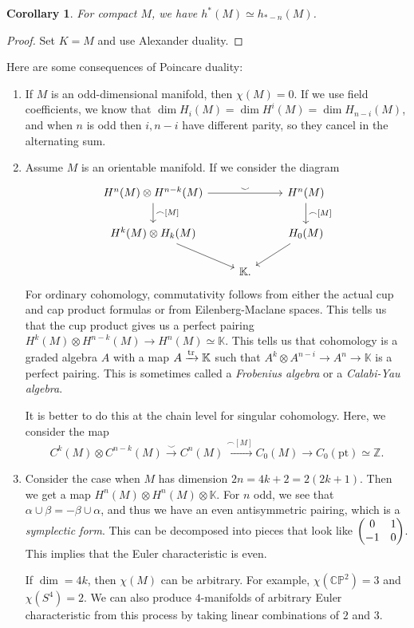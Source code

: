 \documentclass[leqno, openany]{memoir}
\newtheorem{cor}[thm]{Corollary}
\theoremstyle{definition}
\theoremstyle{remark}
\theoremstyle{plain}
\theoremstyle{definition}
\theoremstyle{remark}
\newcommand{\C}{\mathbb{C}}
\newcommand{\Z}{\mathbb{Z}}
\renewcommand{\P}{\mathbb{P}}
\newcommand{\mr}[1]{\mathrm{#1}}
\begin{document}
\begin{cor}
    For compact $M$, we have $h^*(M) \simeq h_{*-n}(M)$.
\end{cor}

\begin{proof}
    Set $K = M$ and use Alexander duality.
\end{proof}

Here are some consequences of Poincare duality:
\begin{enumerate}
    \item If $M$ is an odd-dimensional manifold, then $\chi(M) = 0$. If we use field coefficients, we know that $\dim H_i(M) = \dim H^i(M) = \dim H_{n-i}(M)$, and when $n$ is odd then $i, n-i$ have different parity, so they cancel in the alternating sum.
    \item Assume $M$ is an orientable manifold. If we consider the diagram
        \begin{equation*}
        \begin{tikzcd}
            H^n(M) \otimes H^{n-k}(M) \arrow{rr}{\smile} \arrow{d}{\frown{[M]}} & & H^n(M) \arrow{d}{\frown {[M]}} \\
            H^k(M) \otimes H_k(M) \arrow{dr} & & H_0(M) \arrow{dl} \\
                                             & \mathbb{K}.
        \end{tikzcd}
        \end{equation*}
        For ordinary cohomology, commutativity follows from either the actual cup and cap product formulas or from Eilenberg-Maclane spaces. This tells us that the cup product gives us a perfect pairing $H^k(M) \otimes H^{n-k}(M) \to H^n(M) \simeq \mathbb{K}$. This tells us that cohomology is a graded algebra $A$ with a map $A \xrightarrow{\tr} \mathbb{K}$ such that $A^k \otimes A^{n-i} \to A^n \to \mathbb{K}$ is a perfect pairing. This is sometimes called a \textit{Frobenius algebra} or a \textit{Calabi-Yau algebra}.  

    It is better to do this at the chain level for singular cohomology. Here, we consider the map
    \[ C^k(M) \otimes C^{n-k}(M) \xrightarrow{\smile} C^n(M) \xrightarrow{\frown{{[M]}}} C_0(M) \to C_0(\mr{pt}) \simeq \Z. \]
\item Consider the case when $M$ has dimension $2n = 4k+2 = 2(2k+1)$. Then we get a map $H^n(M) \otimes H^n(M) \otimes \mathbb{K}$. For $n$ odd, we see that $\alpha \cup \beta = - \beta \cup \alpha$, and thus we have an even antisymmetric pairing, which is a \textit{symplectic form}. This can be decomposed into pieces that look like $\mqty(0 & 1 \\ -1 & 0)$. This implies that the Euler characteristic is even.

    If $\dim = 4k$, then $\chi(M)$ can be arbitrary. For example, $\chi(\C\P^2) = 3$ and $\chi(S^4) = 2$. We can also produce $4$-manifolds of arbitrary Euler characteristic from this process by taking linear combinations of $2$ and $3$.
\end{enumerate}
\end{document}
